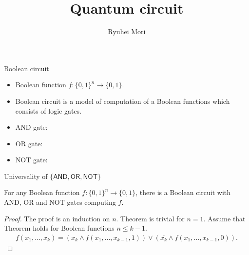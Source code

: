 \documentclass{beamer}
\title{Quantum circuit}
\author{Ryuhei Mori}
\institute{Tokyo Institute of Technology}
\date{}
\newcommand\emm[1]{\textcolor{redorange}{{#1}}}
\begin{document}
\begin{frame}[plain]
\maketitle
\end{frame}



\begin{frame}{Boolean circuit}
\begin{itemize}
\setlength{\itemsep}{2em}
\item Boolean function $f\colon \{0,1\}^n\to\{0,1\}$.
\item \emm{Boolean circuit} is a model of computation of a Boolean functions which consists of logic \emm{gates}.
\item AND gate:
\item OR gate:
\item NOT gate:
\end{itemize}
\end{frame}

\begin{frame}{Universality of $\{\mathsf{AND}, \mathsf{OR},\mathsf{NOT}\}$}
\begin{theorem}
For \emm{any} Boolean function $f\colon \{0,1\}^n\to\{0,1\}$, there is a Boolean circuit with AND, OR and NOT gates computing $f$.
\end{theorem}
\begin{proof}
The proof is an induction on $n$. Theorem is trivial for $n=1$.
Assume that Theorem holds for Boolean functions $n \le k-1$.
\begin{align*}
f(x_1,\dotsc,x_k) = (x_k \wedge f(x_1,\dotsc,x_{k-1}, 1)) \vee (\overline{x_k} \wedge f(x_1,\dotsc,x_{k-1}, 0)).
\end{align*}
\end{proof}
\end{frame}
\end{document}
